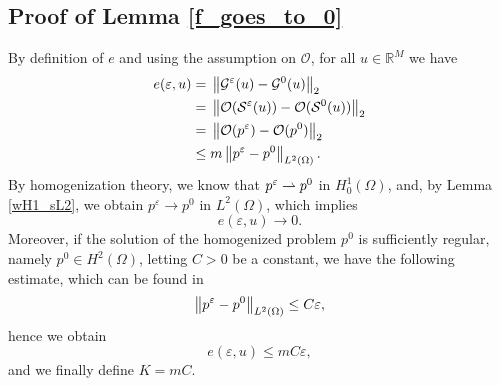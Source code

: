 %
%

\subsection*{Proof of Lemma \ref{f_goes_to_0}}

By definition of $e$ and using the assumption on $\mathcal{O}$, for all $u \in \mathbb{R}^M$ we have
\begin{align*}
e(\varepsilon, u) = & \; \left\|\mathcal{G}^{\varepsilon}(u) - \mathcal{G}^0(u)\right\|_2 \\
= & \; \left\|\mathcal{O}(\mathcal{S}^{\varepsilon}(u)) - \mathcal{O}(\mathcal{S}^0(u))\right\|_2 \\
= & \; \left\|\mathcal{O}(p^{\varepsilon}) - \mathcal{O}(p^0)\right\|_2 \\
\le & \; m \left\|p^{\varepsilon} - p^0\right\|_{L^2(\Omega)}.
\end{align*}
By homogenization theory, we know that $p^{\varepsilon} \rightharpoonup p^0$ in $H^1_0(\Omega)$, and, by Lemma \ref{wH1_sL2}, we obtain $p^{\varepsilon} \to p^0$ in $L^2(\Omega)$, which implies
\[ e(\varepsilon, u) \to 0. \]
Moreover, if the solution of the homogenized problem $p^0$ is sufficiently regular, namely $p^0 \in H^2(\Omega)$, letting $C > 0$ be a constant, we have the following estimate, which can be found in \cite{Gri05}
\[ \left\|p^{\varepsilon} - p^0\right\|_{L^2(\Omega)} \le C \varepsilon, \]
hence we obtain
\[ e(\varepsilon, u) \le m C \varepsilon, \]
and we finally define $K = m C$.

